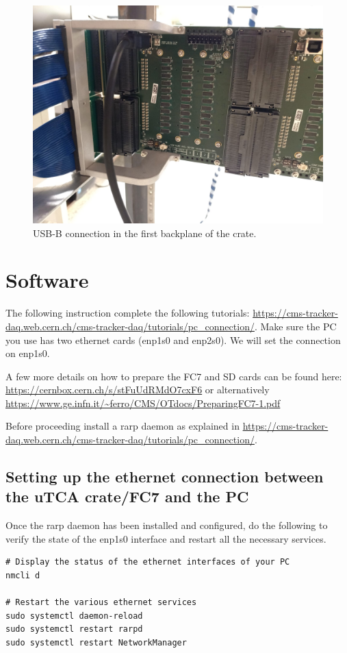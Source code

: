 \documentclass[10pt,a4paper]{article}
\begin{document}
\begin{figure}[h!]
\centering
 \includegraphics[width=0.8\linewidth]{USBBCrate.jpeg} 
  \caption{USB-B connection in the first backplane of the crate.}
  \label{USBBCrate}
\end{figure}

\section{Software}

The following instruction complete the following tutorials:
\url{https://cms-tracker-daq.web.cern.ch/cms-tracker-daq/tutorials/pc_connection/}.
Make sure the PC you use has two ethernet cards (enp1s0 and enp2s0). We will set the connection on enp1s0.

A few more details on how to prepare the FC7 and SD cards can be found here:
\url{https://cernbox.cern.ch/s/stFuUdRMdO7cxF6} or alternatively \url{https://www.ge.infn.it/~ferro/CMS/OTdocs/PreparingFC7-1.pdf}

Before proceeding install a rarp daemon as explained in \url{https://cms-tracker-daq.web.cern.ch/cms-tracker-daq/tutorials/pc_connection/}.

\subsection{Setting up the ethernet connection between the uTCA crate/FC7 and the PC} 
Once the rarp daemon has been installed and configured, do the following to verify the state of the enp1s0 interface and restart all the necessary services.
\begin{framed}
\begin{verbatim}
# Display the status of the ethernet interfaces of your PC
nmcli d 

# Restart the various ethernet services
sudo systemctl daemon-reload
sudo systemctl restart rarpd
sudo systemctl restart NetworkManager
\end{verbatim}
\end{framed}
\end{document}
